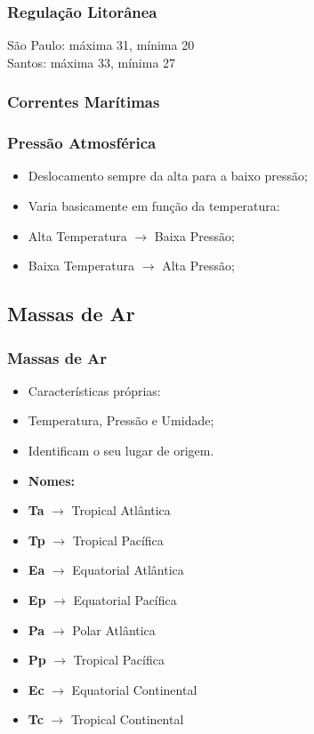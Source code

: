 \begin{frame}
  \frametitle{Regulação Litorânea}
  {\small
  São Paulo: máxima 31\textcelsius{}, mínima 20\textcelsius{}\\
  Santos: máxima 33\textcelsius{}, mínima 27\textcelsius{}
  }
  \begin{center}
  \end{center}
\end{frame}


\begin{frame}
  \frametitle{Correntes Marítimas}
  \begin{center}
  \end{center}
\end{frame}

\begin{frame}
  \frametitle{Pressão Atmosférica}
  \begin{itemize}[<+-| alert@+>]
    \item Deslocamento sempre da alta para a baixo pressão;
    \item Varia basicamente em função da temperatura:
    \item Alta Temperatura $\rightarrow$ Baixa Pressão;
    \item Baixa Temperatura $\rightarrow$ Alta Pressão;
  \end{itemize}
\end{frame}


\subsection{Massas de Ar}
\begin{frame}
  \frametitle{Massas de Ar}
  \begin{itemize}[<+-| alert@+>]
    \item Características próprias:
    \item Temperatura, Pressão e Umidade;
    \item Identificam o seu lugar de origem.
    \item {\bf Nomes:}
    \item {\bf Ta} $\rightarrow$ Tropical Atlântica
    \item {\bf Tp} $\rightarrow$ Tropical Pacífica
    \item {\bf Ea} $\rightarrow$ Equatorial Atlântica
    \item {\bf Ep} $\rightarrow$ Equatorial Pacífica
    \item {\bf Pa} $\rightarrow$ Polar Atlântica
    \item {\bf Pp} $\rightarrow$ Tropical Pacífica
    \item {\bf Ec} $\rightarrow$ Equatorial Continental
    \item {\bf Tc} $\rightarrow$ Tropical Continental
  \end{itemize}
\end{frame}

